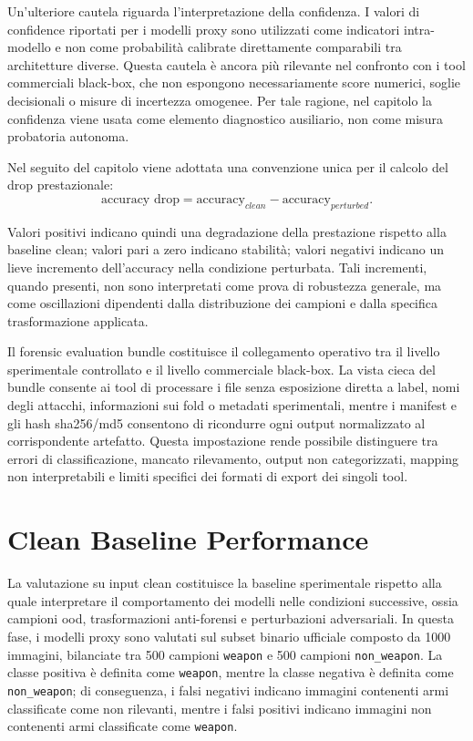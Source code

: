 Un'ulteriore cautela riguarda l'interpretazione della confidenza. I valori di
confidence riportati per i modelli proxy sono utilizzati come indicatori
intra-modello e non come probabilità calibrate direttamente comparabili tra
architetture diverse. Questa cautela è ancora più rilevante nel confronto con i
tool commerciali black-box, che non espongono necessariamente score numerici,
soglie decisionali o misure di incertezza omogenee. Per tale ragione, nel
capitolo la confidenza viene usata come elemento diagnostico ausiliario, non come
misura probatoria autonoma.

Nel seguito del capitolo viene adottata una convenzione unica per il calcolo del
drop prestazionale:
\[
\text{accuracy drop} =
\text{accuracy}_{clean} - \text{accuracy}_{perturbed}.
\]

Valori positivi indicano quindi una degradazione della prestazione rispetto alla
baseline clean; valori pari a zero indicano stabilità; valori negativi indicano
un lieve incremento dell'accuracy nella condizione perturbata. Tali incrementi,
quando presenti, non sono interpretati come prova di robustezza generale, ma come
oscillazioni dipendenti dalla distribuzione dei campioni e dalla specifica
trasformazione applicata.

Il forensic evaluation bundle costituisce il collegamento operativo tra il
livello sperimentale controllato e il livello commerciale black-box. La vista
cieca del bundle consente ai tool di processare i file senza esposizione diretta
a label, nomi degli attacchi, informazioni sui fold o metadati sperimentali,
mentre i manifest e gli hash \gls{sha256}/\gls{md5} consentono di ricondurre
ogni output normalizzato al corrispondente artefatto. Questa impostazione rende
possibile distinguere tra errori di classificazione, mancato rilevamento, output
non categorizzati, mapping non interpretabili e limiti specifici dei formati di
export dei singoli tool.



\section{Clean Baseline Performance}
\label{sec:results-clean-baseline}

La valutazione su input clean costituisce la baseline sperimentale rispetto alla
quale interpretare il comportamento dei modelli nelle condizioni successive,
ossia campioni \gls{ood}, trasformazioni anti-forensi e perturbazioni
adversariali. In questa fase, i modelli proxy sono valutati sul subset binario
ufficiale composto da 1000 immagini, bilanciate tra 500 campioni
\texttt{weapon} e 500 campioni \texttt{non\_weapon}. La classe positiva è
definita come \texttt{weapon}, mentre la classe negativa è definita come
\texttt{non\_weapon}; di conseguenza, i falsi negativi indicano immagini
contenenti armi classificate come non rilevanti, mentre i falsi positivi indicano
immagini non contenenti armi classificate come \texttt{weapon}.

